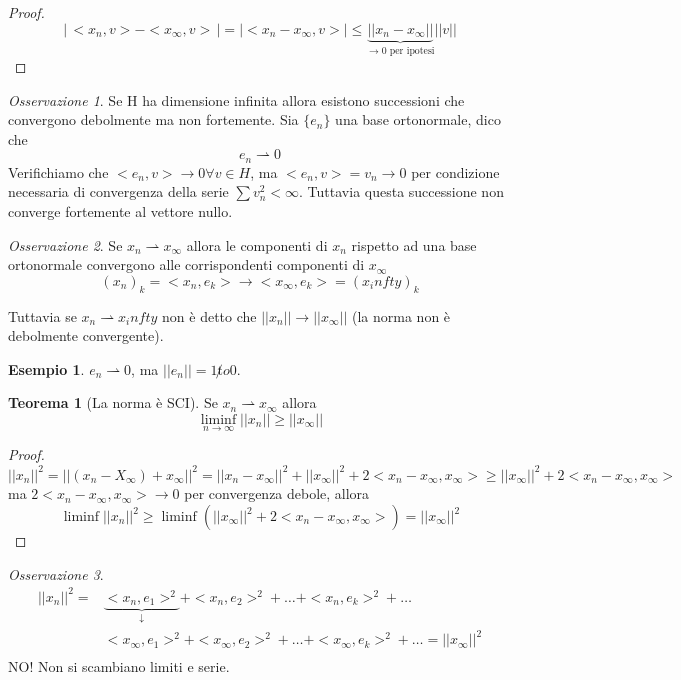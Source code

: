 \documentclass[a4paper]{book}
\theoremstyle{definition}
\newtheorem{ex}{Esempio}
\theoremstyle{remark}
\newtheorem{oss}{Osservazione}
\theoremstyle{definition}
\newtheorem{teo}{Teorema}
\begin{document}
\begin{proof}
	$$\big| \, <x_n, v> - <x_\infty, v> \, \big| = \big| <x_n - x_\infty, v>\big|  \le \underbrace{||x_n - x_\infty||}_{\to 0 \text{ per ipotesi} } ||v|| $$
\end{proof}


\begin{oss}
	Se H ha dimensione infinita allora esistono successioni che convergono debolmente ma non fortemente. Sia $\{e_n\}$ una base ortonormale, dico che $$e_n \rightharpoonup 0$$ Verifichiamo che $<e_n, v> \to 0 \forall v \in H$, ma $<e_n, v> = v_n \to 0$ per condizione necessaria di convergenza della serie $\sum v_n^2 < \infty$. Tuttavia questa successione non converge fortemente al vettore nullo.
\end{oss}

\begin{oss}
	Se $x_n \rightharpoonup x_\infty$ allora le componenti di $x_n$ rispetto ad una base ortonormale convergono alle corrispondenti componenti di $x_\infty$
	$$(x_n)_k = <x_n, e_k> \to <x_\infty, e_k> = (x_infty)_k$$
\end{oss}

Tuttavia se $x_n \rightharpoonup x_infty$ non è detto che $||x_n|| \to ||x_\infty||$ (la norma non è debolmente convergente).

\begin{ex}
	$e_n \rightharpoonup 0$, ma $||e_n|| = 1 \not to 0$.
\end{ex}

\begin{teo}[La norma è SCI]
	Se $x_n \rightharpoonup x_\infty$ allora $$\liminf_{n\to\infty}||x_n|| \ge ||x_\infty||$$
\end{teo}

\begin{proof}
	$||x_n||^2 = || (x_n - X_\infty) + x_\infty||^2 = ||x_n - x_\infty||^2 + ||x_\infty||^2 + 2<x_n - x_\infty, x_\infty> \ge ||x_\infty||^2 + 2<x_n - x_\infty, x_\infty>$ \\
	ma $2<x_n - x_\infty, x_\infty> \to 0$ per convergenza debole, allora 
	$$\liminf ||x_n||^2 \ge \liminf(||x_\infty|| ^2 + 2<x_n - x_\infty, x_\infty>) = ||x_\infty||^2$$
\end{proof}

\begin{oss}
	\[
	\begin{split}
		||x_n||^2 = & \underbrace{<x_n, e_1>^2}_{ \downarrow} + <x_n, e_2>^2 + \dots + <x_n, e_k>^2 + \dots \\
		& <x_\infty, e_1>^2 + <x_\infty, e_2>^2 + \dots + <x_\infty, e_k>^2 + \dots = ||x_\infty||^2 \\
	\end{split}
	\]
	NO! Non si scambiano limiti e serie.
\end{oss}
\end{document}
